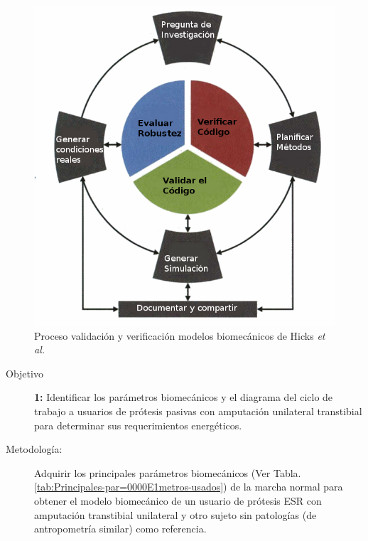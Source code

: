 \documentclass[12pt,english]{article}
\begin{document}
\begin{figure}[ht]
\begin{centering}
\includegraphics[scale=0.5]{verificationprocess}
\par\end{centering}

\caption{\label{fig:Proceso-validaci=0000F3n-y}Proceso validación y verificación
modelos biomecánicos de Hicks \emph{et al.} \cite{Hicks2014}}
\end{figure}
\begin{description}
\item [{Objetivo}]  \textbf{1:} Identificar los parámetros biomecánicos
y el diagrama del ciclo de trabajo a usuarios de prótesis pasivas
con amputación unilateral transtibial para determinar sus requerimientos
energéticos.
\item [{Metodología:}] Adquirir los principales parámetros biomecánicos
(Ver Tabla. \ref{tab:Principales-par=0000E1metros-usados}) de la marcha
normal para obtener el modelo biomecánico de un usuario de prótesis
ESR con amputación transtibial unilateral y otro sujeto sin patologías
(de antropometría similar) como referencia.
\end{description}
\end{document}
